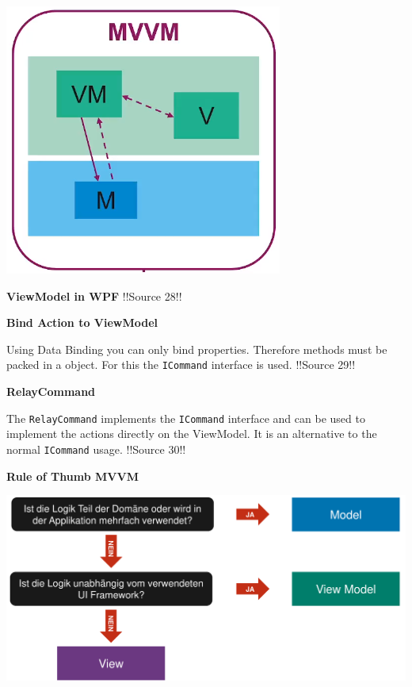 \documentclass[10pt,twoside,landscape]{article}
\begin{document}
\begin{multicols}{4}
\begin{center}
\includegraphics[width=.9\linewidth]{img/mvvm.png}
\end{center}

\textbf{ViewModel in WPF}
!!Source 28!!

\textbf{Bind Action to ViewModel}

Using Data Binding you can only bind properties.
Therefore methods must be packed in a object.
For this the \texttt{ICommand} interface is used.
!!Source 29!!

\textbf{RelayCommand}

The \texttt{RelayCommand} implements the \texttt{ICommand} interface and can be used to implement the actions directly on the ViewModel.
It is an alternative to the normal \texttt{ICommand} usage.
!!Source 30!!

\textbf{Rule of Thumb MVVM}

\begin{center}
\includegraphics[width=.9\linewidth]{img/rule_of_thumb_logic_in_mvvm_.png}
\end{center}


\end{multicols}
\end{document}
